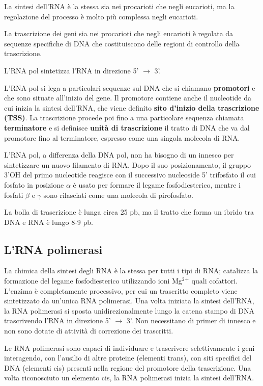 \documentclass[11pt]{book}
\begin{document}
La sintesi dell'RNA è la stessa sia nei procarioti che negli eucarioti,
ma la regolazione del processo è molto più complessa negli eucarioti.

La trascrizione dei geni sia nei procarioti che negli eucarioti è
regolata da sequenze specifiche di DNA che costituiscono delle regioni
di controllo della trascrizione.

L'RNA pol sintetizza l'RNA in direzione 5' \(\rightarrow\) 3'.

L'RNA pol si lega a particolari sequenze sul DNA che si chiamano
\textbf{promotori} e che sono situate all'inizio del gene. Il promotore
contiene anche il nucleotide da cui inizia la sintesi dell'RNA, che
viene definito \textbf{sito d'inizio della trascrizione (TSS)}. La
trascrizione procede poi fino a una particolare sequenza chiamata
\textbf{terminatore} e si definisce \textbf{unità di trascrizione} il
tratto di DNA che va dal promotore fino al terminatore, espresso come
una singola molecola di RNA.

L'RNA pol, a differenza della DNA pol, non ha bisogno di un innesco per
sintetizzare un nuovo filamento di RNA. Dopo il suo posizionamento, il
gruppo 3'OH del primo nucleotide reagisce con il successivo nucleoside
5' trifosfato il cui fosfato in posizione \(\alpha\) è usato per formare
il legame fosfodiesterico, mentre i fosfati \(\beta\) e \(\gamma\) sono
rilasciati come una molecola di pirofosfato.

La bolla di trascrizione è lunga circa 25 pb, ma il tratto che forma un
ibrido tra DNA e RNA è lungo 8-9 pb.

\subsection{L'RNA polimerasi}\label{lrna-polimerasi}

La chimica della sintesi degli RNA è la stessa per tutti i tipi di RNA;
catalizza la formazione del legame fosfodiesterico utilizzando ioni
Mg\(^2\)\(^+\) quali cofattori. L'enzima è completamente processivo, per
cui un trascritto completo viene sintetizzato da un'unica RNA
polimerasi. Una volta iniziata la sintesi dell'RNA, la RNA polimerasi si
sposta unidirezionalmente lungo la catena stampo di DNA trascrivendo
l'RNA in direzione 5' \(\rightarrow\) 3'. Non necessitano di primer di
innesco e non sono dotate di attività di correzione dei trascritti.

Le RNA polimerasi sono capaci di individuare e trascrivere
selettivamente i geni interagendo, con l'ausilio di altre proteine
(elementi trans), con siti specifici del DNA (elementi cis) presenti
nella regione del promotore della trascrizione. Una volta riconosciuto
un elemento cis, la RNA polimerasi inizia la sintesi dell'RNA.
\end{document}
